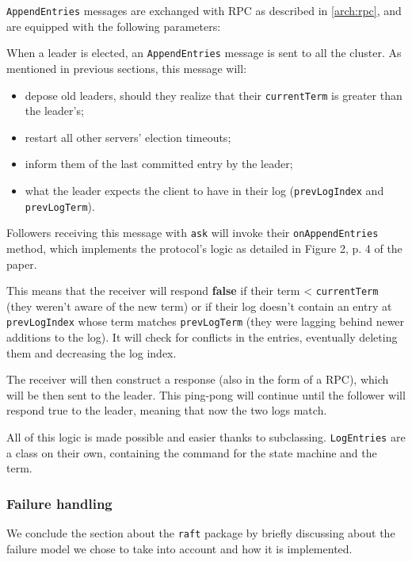 \texttt{AppendEntries} messages are exchanged with RPC as described in \cref{arch:rpc}, and are equipped with the following parameters:


When a leader is elected, an \texttt{AppendEntries} message is sent to all the cluster. As mentioned in previous sections, this message will:

\begin{itemize}
    \item depose old leaders, should they realize that their \texttt{currentTerm} is greater than the leader's;
    \item restart all other servers' election timeouts;
    \item inform them of the last committed entry by the leader;
    \item what the leader expects the client to have in their log (\texttt{prevLogIndex} and \texttt{prevLogTerm}).
\end{itemize}

Followers receiving this message with \texttt{ask} will invoke their \texttt{onAppendEntries} method, which implements the protocol's logic as detailed in Figure 2, p. 4 \cite{ongaro_search_nodate} of the paper.

This means that the receiver will respond \textbf{false} if their term < \texttt{currentTerm} (they weren't aware of the new term) or if their log doesn’t contain an entry at \texttt{prevLogIndex} whose term matches \texttt{prevLogTerm} (they were lagging behind newer additions to the log). It will check for conflicts in the entries, eventually deleting them and decreasing the log index.

The receiver will then construct a response (also in the form of a RPC), which will be then sent to the leader. This ping-pong will continue until the follower will respond true to the leader, meaning that now the two logs match.

All of this logic is made possible and easier thanks to subclassing. \texttt{LogEntries} are a class on their own, containing the command for the state machine and the term.

\subsubsection{Failure handling}
\label{arch:failures}

We conclude the section about the \texttt{raft} package by briefly discussing about the failure model we chose to take into account and how it is implemented.

